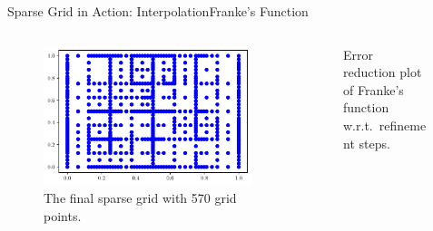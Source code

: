 \begin{frame}{Sparse Grid in Action: Interpolation}{Franke's Function}
    \begin{columns}
        \begin{column}{0.4\textwidth}
            \begin{figure}
                \centering
                \includegraphics[width=\textwidth]{figures/grid_final_franke.pdf}
                \caption{The final sparse grid with 570 grid points.}
            \end{figure}
        \end{column}
        \begin{column}{0.5\textwidth}
            \begin{figure}
                \centering
                \scalebox{0.7}{}
                \caption{Error reduction plot of Franke's function w.r.t.\ refinement steps.}
            \end{figure}
        \end{column}
    \end{columns}
\end{frame}

